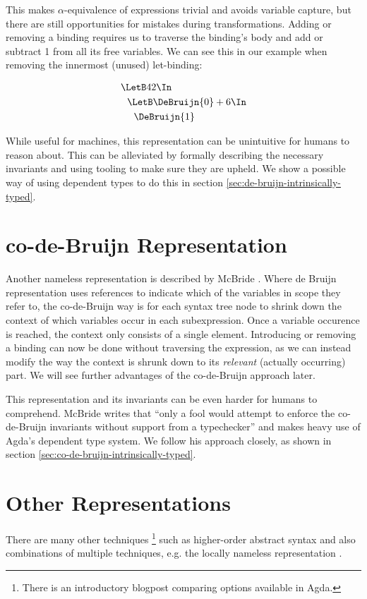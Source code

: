 This makes $\alpha$-equivalence of expressions trivial and avoids variable capture,
but there are still opportunities for mistakes during transformations.
Adding or removing a binding
requires us to traverse the binding's body and add or subtract 1 from all its free variables.
We can see this in our example when removing the innermost (unused) let-binding:

\begin{align*}
  &\LetB 42 \In                   \\
  &\ \ \LetB \DeBruijn{0} + 6 \In \\
  &\ \ \ \ \DeBruijn{1}
\end{align*}

While useful for machines, this representation can be unintuitive for humans to reason about.
This can be alleviated by formally describing the necessary invariants
and using tooling to make sure they are upheld.
We show a possible way of using dependent types to do this in section
\ref{sec:de-bruijn-intrinsically-typed}.

\section{co-de-Bruijn Representation}
\label{sec:binding-representation-co-de-bruijn}

Another nameless representation is described by McBride \cite{McBride2018EveryBodysGotToBeSomewhere}.
Where de Bruijn representation uses references to indicate which of the variables in scope they refer to,
the co-de-Bruijn way is for each syntax tree node
to shrink down the context of which variables occur in each subexpression.
Once a variable occurence is reached, the context only consists of a single element.
Introducing or removing a binding can now be done without traversing the expression,
as we can instead modify the way the context is shrunk down to its \emph{relevant}
(actually occurring) part.
We will see further advantages of the co-de-Bruijn approach later.

This representation and its invariants can be even harder for humans to comprehend.
McBride writes that
``only a fool would attempt to enforce the co-de-Bruijn invariants without support
from a typechecker''
and makes heavy use of Agda's dependent type system.
We follow his approach closely, as shown in section
\ref{sec:co-de-bruijn-intrinsically-typed}.

\section{Other Representations}
\label{sec:binding-representation-other}

There are many other techniques%
\footnote{
There is an introductory blogpost
\cite{Cockx2021RepresentationsBinding}
comparing options available in Agda.
}
such as higher-order abstract syntax
\cite{Pfenning1988HOAS}
and also combinations of multiple techniques, e.g. the locally nameless representation
\cite{Chargueraud2011LocallyNameless}.
